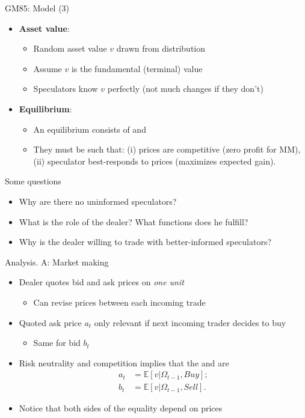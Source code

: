 \documentclass[english,10pt
,aspectratio=169
]{beamer}
\begin{document}
\begin{frame}{GM85: Model (3)}
\begin{itemize}
	\item \textbf{Asset value}:
	\begin{itemize}
		\item Random asset value $v$ drawn from distribution
		\item Assume $v$ is the fundamental (terminal) value
		\item Speculators know $v$ perfectly (not much changes if they don't)
	\end{itemize}
	\item \textbf{Equilibrium}:
	\begin{itemize}
		\item An equilibrium consists of  and 
		\item They must be such that: (i) prices are competitive (zero profit for MM), (ii) speculator best-responds to prices (maximizes expected gain).
	\end{itemize}
\end{itemize}
\end{frame}


\begin{frame}{Some questions}
\begin{itemize}%
	\item Why are there no uninformed speculators?
	\item What is the role of the dealer? What functions does he fulfill?
	\item Why is the dealer willing to trade with better-informed speculators?
\end{itemize}
\end{frame}


\begin{frame}{Analysis. A: Market making}
\begin{itemize}%
	\item Dealer quotes bid and ask prices on \textit{one unit}
	\begin{itemize}
		\item Can revise prices between each incoming trade
	\end{itemize}
	\item Quoted ask price $a_t$ only relevant if next incoming trader decides to buy
	\begin{itemize}
		\item Same for bid $b_t$
	\end{itemize}
	\item Risk neutrality and competition implies that the  and  are
	\begin{align*}
		a_t & = \mathbb{E}[v|\Omega_{t-1}, Buy]; \\
		b_t &= \mathbb{E}[v|\Omega_{t-1},  Sell].
	\end{align*}
	\item Notice that both sides of the equality depend on prices
\end{itemize}
\end{frame}
\end{document}
